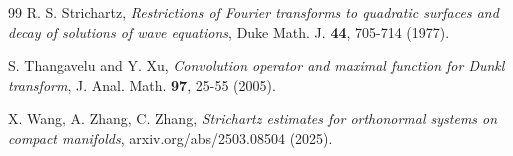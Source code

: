 \documentclass[a4paper,11pt, reqno]{amsart}
\numberwithin{equation}{section}
\theoremstyle{plain}
\theoremstyle{definition}
\theoremstyle{remark}
\begin{document}
\begin{thebibliography}{99}
  R. S. Strichartz, \emph{Restrictions of Fourier transforms to quadratic surfaces and decay of solutions of wave equations}, Duke Math. J. \textbf{44}, 705-714 (1977).

 S. Thangavelu and  Y. Xu, \emph{Convolution operator and maximal function for Dunkl transform}, J. Anal. Math. \textbf{97}, 25-55 (2005).

 X. Wang, A. Zhang, C. Zhang, \emph{Strichartz estimates for orthonormal systems on compact manifolds}, arxiv.org/abs/2503.08504 (2025).

\end{thebibliography}
	
	
\end{document}

